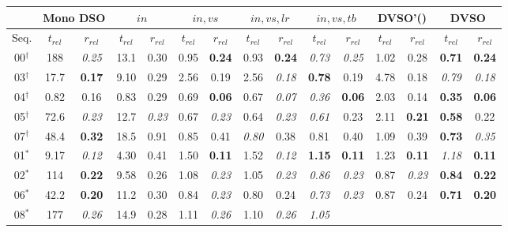 \documentclass[runningheads]{llncs}
\begin{document}
\begin{table}[tb]
	\centering
	\tiny
	\begin{tabular}{c|cc|cc|cc|cc|cc|cc|cc}
		& \multicolumn{2}{c|}{Mono DSO} & 
		\multicolumn{2}{c|}{$in$} & 
		\multicolumn{2}{c|}{$in,vs$} 
		& 
		\multicolumn{2}{c|}{$in,vs,lr$} & 
		\multicolumn{2}{c|}{$in,vs,tb$}&
		\multicolumn{2}{c|}{DVSO'(\cite{godard2016unsupervised})}&
		\multicolumn{2}{c}{DVSO}\\ 
		\hline
		Seq. & $t_{rel}$ & $r_{rel}$ & $t_{rel}$ & $r_{rel}$ & $t_{rel}$ & 
		$r_{rel}$ & $t_{rel}$ & $r_{rel}$& $t_{rel}$ & $r_{rel}$& $t_{rel}$ & 
		$r_{rel}$& $t_{rel}$ & $r_{rel}$\\
		00$^\dagger$   & 188 & \textit{0.25} & 13.1 & 0.30 & 0.95 & 
		\textbf{0.24} & 0.93 & \textbf{0.24}& 
		\textit{0.73} & \textit{0.25}& 1.02 & 0.28& \textbf{0.71} & 
		\textbf{0.24}
		\\
		03$^\dagger$    & 17.7 & \textbf{0.17} & 9.10 & 0.29 & 2.56 & 0.19 
		&2.56 & \textit{0.18}& \textbf{0.78} & 0.19& 4.78 & 0.18& \textit{0.79} 
		& 
		\textit{0.18}
		\\
		04$^\dagger$    & 0.82 & 0.16 & 0.83 & 0.29 & 0.69 & \textbf{0.06} 
		&0.67 & \textit{0.07}& 
		\textit{0.36} & \textbf{0.06}& 2.03 & 0.14& \textbf{0.35} & 
		\textbf{0.06}
		\\
		05$^\dagger$    & 72.6 & \textit{0.23} & 12.7 & \textit{0.23} & 0.67 & 
		\textit{0.23} &0.64 & \textit{0.23}& 
		\textit{0.61} & 0.23& 2.11 & \textbf{0.21}& \textbf{0.58} & 0.22
		\\
		07$^\dagger$    & 48.4 & \textbf{0.32} & 18.5 & 0.91 & 0.85 & 0.41 & 
		\textit{0.80} & 0.38&0.81 & 0.40& 1.09 & 0.39& \textbf{0.73} & 
		\textit{0.35}
		\\
		\hline
		01$^\ast$   & 9.17 & \textit{0.12} & 4.30 & 0.41 & 1.50 & \textbf{0.11} 
		&1.52 & 
		\textit{0.12}& 
		\textbf{1.15} 
		& \textbf{0.11}& 1.23 & \textbf{0.11}& \textit{1.18} & \textbf{0.11}
		\\
		02$^\ast$   & 114 & \textbf{0.22} & 9.58 & 0.26 & 1.08 & \textit{0.23} 
		&1.05 & 
		\textit{0.23}& \textit{0.86} & \textit{0.23}& 0.87 & \textit{0.23}& 
		\textbf{0.84} & 
		\textbf{0.22}
		\\
		06$^\ast$   & 42.2 & \textbf{0.20} & 11.2 & 0.30 & 0.84 & \textit{0.23} 
		&0.80 & 
		0.24& 
		\textit{0.73} & \textit{0.23}& 0.87 & 0.24& 
		\textbf{0.71} & 
		\textbf{0.20}
		\\
		08$^\ast$   & 177 & \textit{0.26} & 14.9 & 0.28 & 1.11 & \textit{0.26} 
		& 1.10 & 
		\textit{0.26}&\textit{1.05} 

\end{tabular}
\end{table}
\end{document}
